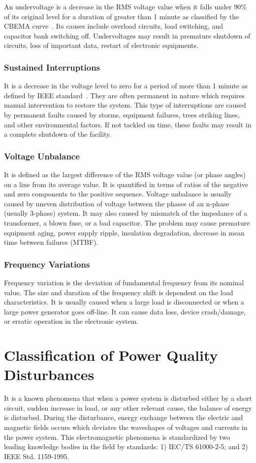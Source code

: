 An undervoltage is a decrease in the RMS voltage value when it falls under 90\% of its original level for a duration of greater than 1 minute as classified by the CBEMA curve~\cite{iti_curve}. Its causes include overload circuits, load switching, and capacitor bank switching off. Undervoltages may result in premature shutdown of circuits, loss of important data, restart of electronic equipments.

\subsubsection{Sustained Interruptions}
It is a decrease in the voltage level to zero for a period of more than 1 minute as defined by IEEE standard~\cite{IEEE09_1159}. They are often permanent in nature which requires manual intervention to restore the system. This type of interruptions are caused by permanent faults caused by storms, equipment failures, trees striking lines, and other environmental factors. If not tackled on time, these faults may result in a complete shutdown of the facility.

\subsubsection{Voltage Unbalance}
It is defined as the largest difference of the RMS voltage value (or phase angles) on a line from its average value. It is quantified in terms of ratios of the negative and zero components to the positive sequence. Voltage unbalance is usually caused by uneven distribution of voltage between the phases of an n-phase (usually 3-phase) system. It may also caused by mismatch of the impedance of a transformer, a blown fuse, or a bad capacitor. The problem may cause premature equipment aging, power supply ripple, insulation degradation, decrease in mean time between failures (MTBF).

\subsubsection{Frequency Variations}
Frequency variation is the deviation of fundamental frequency from its nominal value. The size and duration of the frequency shift is dependent on the load characteristics. It is usually caused when a large load is disconnected or when a large power generator goes off-line. It can cause data loss, device crash/damage, or erratic operation in the electronic system.

\section{Classification of Power Quality Disturbances}
\label{PQclassification}
It is a known phenomena that when a power system is disturbed either by a short circuit, sudden increase in load, or any other relevant cause, the balance of energy is disturbed. During the disturbance, energy exchange between the electric and magnetic fields occurs which deviates the waveshapes of voltages and currents in the power system. This electromagnetic phenomena is standardized by two leading knowledge bodies in the field by standards: 1) IEC/TS 61000-2-5; and 2) IEEE Std. 1159-1995.

